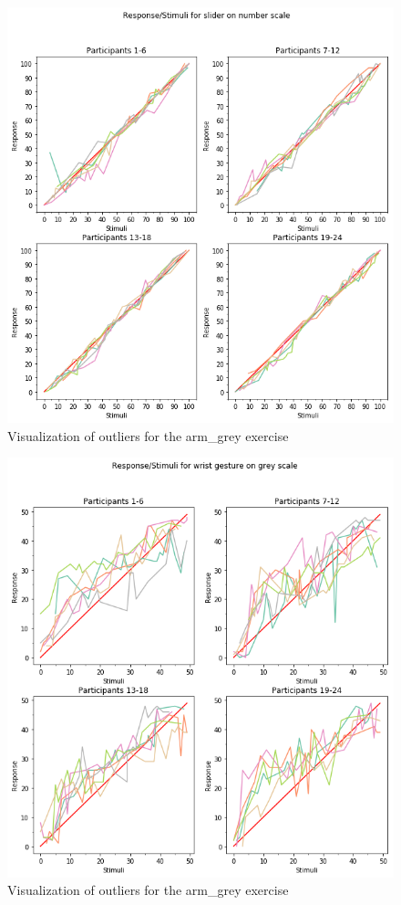 \begin{figure}[h!]
\centering
\includegraphics[width=1.1\textwidth]{figures/visual_out2.png}
\caption{Visualization of outliers for the arm\_grey exercise}
\label{NAN}
\end{figure}

\begin{figure}[h!]
\centering
\includegraphics[width=1.1\textwidth]{figures/visual_out3.png}
\caption{Visualization of outliers for the arm\_grey exercise}
\label{NAN}
\end{figure}

